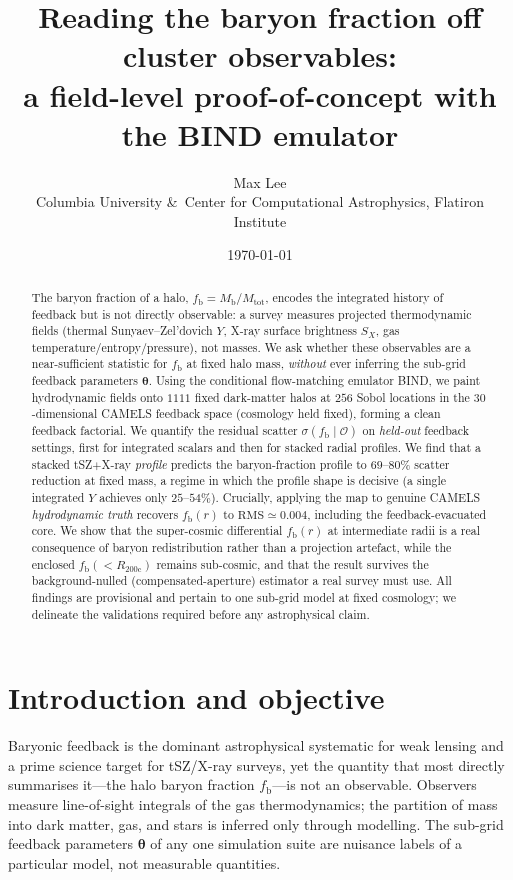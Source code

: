 \documentclass[11pt]{article}
\title{\bf Reading the baryon fraction off cluster observables:\\
a field-level proof-of-concept with the BIND emulator}
\author{Max Lee\\[2pt]
\small Columbia University \&\ Center for Computational Astrophysics, Flatiron Institute}
\date{\today}
\newcommand{\fb}{f_{\mathrm{b}}}
\newcommand{\Ysz}{Y}
\newcommand{\Sx}{S_X}
\newcommand{\Rtwo}{R_{200\mathrm{c}}}
\newcommand{\thetav}{\bm{\theta}}
\begin{document}
\maketitle

\begin{abstract}
\noindent
The baryon fraction of a halo, $\fb=M_{\mathrm{b}}/M_{\mathrm{tot}}$, encodes the
integrated history of feedback but is not directly observable: a survey measures
projected thermodynamic fields (thermal Sunyaev--Zel'dovich $\Ysz$, X-ray surface
brightness $\Sx$, gas temperature/entropy/pressure), not masses. We ask whether
these observables are a near-sufficient statistic for $\fb$ at fixed halo mass,
\emph{without} ever inferring the sub-grid feedback parameters $\thetav$. Using the
conditional flow-matching emulator BIND, we paint hydrodynamic fields onto $1111$
fixed dark-matter halos at $256$ Sobol locations in the $30$-dimensional CAMELS
feedback space (cosmology held fixed), forming a clean feedback factorial. We
quantify the residual scatter $\sigma(\fb\mid\mathcal{O})$ on \emph{held-out}
feedback settings, first for integrated scalars and then for stacked radial
profiles. We find that a stacked tSZ$+$X-ray \emph{profile} predicts the
baryon-fraction profile to $69\text{--}80\%$ scatter reduction at fixed mass, a
regime in which the profile shape is decisive (a single integrated $\Ysz$ achieves
only $25\text{--}54\%$). Crucially, applying the map to genuine CAMELS
\emph{hydrodynamic truth} recovers $\fb(r)$ to $\mathrm{RMS}\simeq0.004$, including
the feedback-evacuated core. We show that the super-cosmic differential $\fb(r)$ at
intermediate radii is a real consequence of baryon redistribution rather than a
projection artefact, while the enclosed $\fb(<\Rtwo)$ remains sub-cosmic, and that
the result survives the background-nulled (compensated-aperture) estimator a real
survey must use. All findings are provisional and pertain to one sub-grid model at
fixed cosmology; we delineate the validations required before any astrophysical
claim.
\end{abstract}

\section{Introduction and objective}
\label{sec:intro}
Baryonic feedback is the dominant astrophysical systematic for weak lensing and a
prime science target for tSZ/X-ray surveys, yet the quantity that most directly
summarises it---the halo baryon fraction $\fb$---is not an observable. Observers
measure line-of-sight integrals of the gas thermodynamics; the partition of mass
into dark matter, gas, and stars is inferred only through modelling. The sub-grid
feedback parameters $\thetav$ of any one simulation suite are nuisance labels of a
particular model, not measurable quantities.
\end{document}
